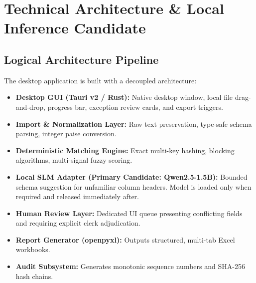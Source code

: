 \documentclass[11pt,a4paper]{article}
\begin{document}
\vspace{0.2cm}

\section{Technical Architecture \& Local Inference Candidate}

\subsection{Logical Architecture Pipeline}
The desktop application is built with a decoupled architecture:
\begin{itemize}
    \item \textbf{Desktop GUI (Tauri v2 / Rust):} Native desktop window, local file drag-and-drop, progress bar, exception review cards, and export triggers.
    \item \textbf{Import \& Normalization Layer:} Raw text preservation, type-safe schema parsing, integer paise conversion.
    \item \textbf{Deterministic Matching Engine:} Exact multi-key hashing, blocking algorithms, multi-signal fuzzy scoring.
    \item \textbf{Local SLM Adapter (Primary Candidate: Qwen2.5-1.5B):} Bounded schema suggestion for unfamiliar column headers. Model is loaded only when required and released immediately after.
    \item \textbf{Human Review Layer:} Dedicated UI queue presenting conflicting fields and requiring explicit clerk adjudication.
    \item \textbf{Report Generator (openpyxl):} Outputs structured, multi-tab Excel workbooks.
    \item \textbf{Audit Subsystem:} Generates monotonic sequence numbers and SHA-256 hash chains.
\end{itemize}
\end{document}
